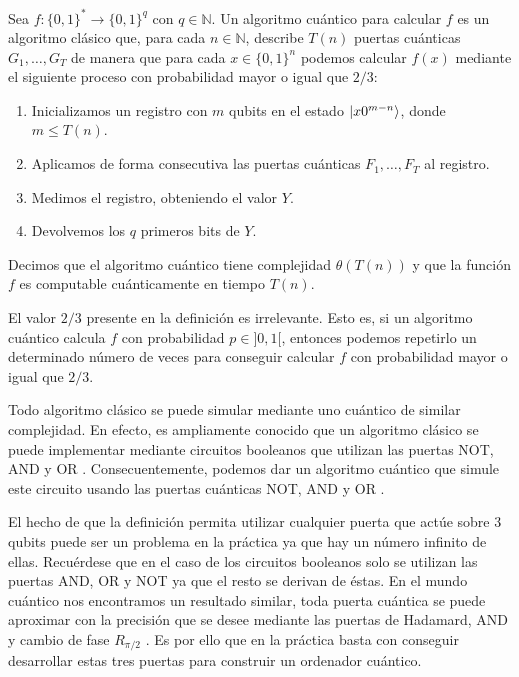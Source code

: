 \documentclass{article}
\begin{document}
\begin{definition}
    Sea $f \colon \{0,1\}^* \to \{0,1\}^q$ con $q \in \mathbb{N}$. Un algoritmo cuántico para calcular $f$ es un algoritmo clásico que, para cada $n \in \mathbb{N}$, describe $T(n)$ puertas cuánticas $G_1, \ldots, G_T$ de manera que para cada $x \in \{0,1\}^n$ podemos calcular $f(x)$ mediante el siguiente proceso con probabilidad mayor o igual que $2/3$:
    \begin{enumerate}
        \item Inicializamos un registro con $m$ qubits en el estado $\ket{x 0^{m-n}}$, donde $m \le T(n)$.
        \item Aplicamos de forma consecutiva las puertas cuánticas $F_1, \ldots, F_T$ al registro.
        \item Medimos el registro, obteniendo el valor $Y$.
        \item Devolvemos los $q$ primeros bits de $Y$.
    \end{enumerate}
    Decimos que el algoritmo cuántico tiene complejidad $\theta(T(n))$ y que la función $f$ es computable cuánticamente en tiempo $T(n)$.
\end{definition}

El valor $2/3$ presente en la definición es irrelevante. Esto es, si un algoritmo cuántico calcula $f$ con probabilidad $p \in ]0,1[$, entonces podemos repetirlo un determinado número de veces para conseguir calcular $f$ con probabilidad mayor o igual que $2/3$.

Todo algoritmo clásico se puede simular mediante uno cuántico de similar complejidad. En efecto, es ampliamente conocido que un algoritmo clásico se puede implementar mediante circuitos booleanos que utilizan las puertas NOT, AND y OR \cite[Capítulo 6]{arora}. Consecuentemente, podemos dar un algoritmo cuántico que simule este circuito usando las puertas cuánticas NOT, AND y OR \cite[Lema 10.10]{arora}.

El hecho de que la definición permita utilizar cualquier puerta que actúe sobre $3$ qubits puede ser un problema en la práctica ya que hay un número infinito de ellas. Recuérdese que en el caso de los circuitos booleanos solo se utilizan las puertas AND, OR y NOT ya que el resto se derivan de éstas. En el mundo cuántico nos encontramos un resultado similar, toda puerta cuántica se puede aproximar con la precisión que se desee mediante las puertas de Hadamard, AND y cambio de fase $R_{\pi /2}$ \cite[Teorema 10.12]{arora}. Es por ello que en la práctica basta con conseguir desarrollar estas tres puertas para construir un ordenador cuántico.
\end{document}
